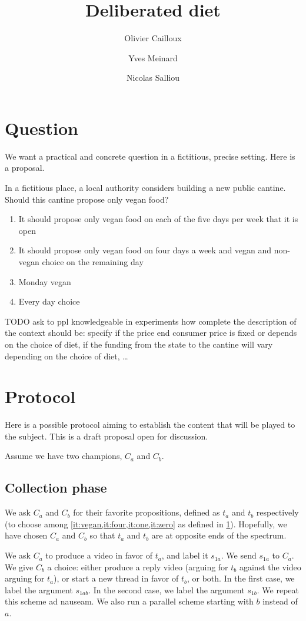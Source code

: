 \documentclass[version=3.21, pagesize, twoside=off, bibliography=totoc, DIV=calc, fontsize=12pt, a4paper]{scrartcl}
\title{Deliberated diet}
\author{Olivier Cailloux}
\author{Yves Meinard}
\affil{Université Paris-Dauphine, PSL Research University, CNRS, LAMSADE, 75016 PARIS, FRANCE}
\author{Nicolas Salliou}
\affil{Affiliation}
\begin{document}
\maketitle

\section{Question}
\label{sec:question}
We want a practical and concrete question in a fictitious, precise setting. Here is a proposal.

In a fictitious place, a local authority considers building a new public cantine. Should this cantine propose only vegan food?
\begin{enumerate}
	\item \label{it:vegan} It should propose only vegan food on each of the five days per week that it is open
	\item \label{it:four} It should propose only vegan food on four days a week and vegan and non-vegan choice on the remaining day
	\item \label{it:one} Monday vegan
	\item \label{it:zero} Every day choice
\end{enumerate}
TODO ask to ppl knowledgeable in experiments how complete the description of the context should be: specify if the price end consumer price is fixed or depends on the choice of diet, if the funding from the state to the cantine will vary depending on the choice of diet, …

\section{Protocol}
\label{sec:prot}
Here is a possible protocol aiming to establish the content that will be played to the subject. This is a draft proposal open for discussion.

Assume we have two champions, $C_a$ and $C_b$.

\subsection{Collection phase}
We ask $C_a$ and $C_b$ for their favorite propositions, defined as $t_a$ and $t_b$ respectively (to choose among \cref{it:vegan,it:four,it:one,it:zero} as defined in \cref{sec:question}). Hopefully, we have chosen $C_a$ and $C_b$ so that $t_a$ and $t_b$ are at opposite ends of the spectrum.

We ask $C_a$ to produce a video in favor of $t_a$, and label it $s_{1a}$. We send $s_{1a}$ to $C_a$. We give $C_b$ a choice: either produce a reply video (arguing for $t_b$ against the video arguing for $t_a$), or start a new thread in favor of $t_b$, or both. In the first case, we label the argument $s_{1ab}$. In the second case, we label the argument $s_{1b}$. We repeat this scheme ad nauseam. We also run a parallel scheme starting with $b$ instead of $a$.
\end{document}
